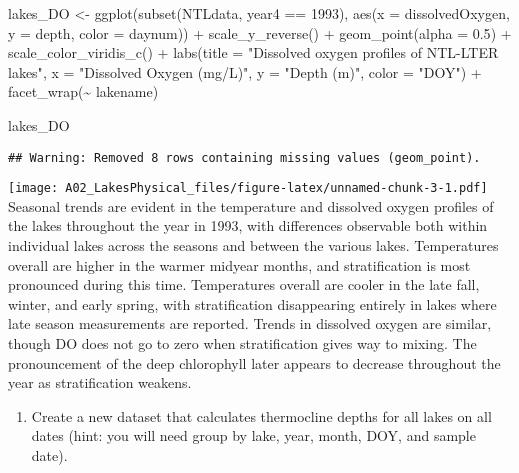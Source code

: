 \documentclass[
]{article}
\newenvironment{Shaded}{\begin{snugshade}}{\end{snugshade}}
\newcommand{\AttributeTok}[1]{\textcolor[rgb]{0.77,0.63,0.00}{#1}}
\newcommand{\DecValTok}[1]{\textcolor[rgb]{0.00,0.00,0.81}{#1}}
\newcommand{\FloatTok}[1]{\textcolor[rgb]{0.00,0.00,0.81}{#1}}
\newcommand{\FunctionTok}[1]{\textcolor[rgb]{0.00,0.00,0.00}{#1}}
\newcommand{\NormalTok}[1]{#1}
\newcommand{\OtherTok}[1]{\textcolor[rgb]{0.56,0.35,0.01}{#1}}
\newcommand{\SpecialCharTok}[1]{\textcolor[rgb]{0.00,0.00,0.00}{#1}}
\newcommand{\StringTok}[1]{\textcolor[rgb]{0.31,0.60,0.02}{#1}}
\providecommand{\tightlist}{%
  \setlength{\itemsep}{0pt}\setlength{\parskip}{0pt}}
\begin{document}
\begin{Shaded}
\begin{Highlighting}[]
\NormalTok{lakes\_DO }\OtherTok{\textless{}{-}} \FunctionTok{ggplot}\NormalTok{(}\FunctionTok{subset}\NormalTok{(NTLdata, year4 }\SpecialCharTok{==} \DecValTok{1993}\NormalTok{), }\FunctionTok{aes}\NormalTok{(}\AttributeTok{x =}\NormalTok{ dissolvedOxygen, }\AttributeTok{y =}\NormalTok{ depth, }\AttributeTok{color =}\NormalTok{ daynum)) }\SpecialCharTok{+}
            \FunctionTok{scale\_y\_reverse}\NormalTok{() }\SpecialCharTok{+}
            \FunctionTok{geom\_point}\NormalTok{(}\AttributeTok{alpha =} \FloatTok{0.5}\NormalTok{) }\SpecialCharTok{+} 
            \FunctionTok{scale\_color\_viridis\_c}\NormalTok{() }\SpecialCharTok{+} 
            \FunctionTok{labs}\NormalTok{(}\AttributeTok{title =} \StringTok{"Dissolved oxygen profiles of NTL{-}LTER lakes"}\NormalTok{,}
                 \AttributeTok{x =} \StringTok{"Dissolved Oxygen (mg/L)"}\NormalTok{, }\AttributeTok{y =} \StringTok{"Depth (m)"}\NormalTok{, }\AttributeTok{color =} \StringTok{"DOY"}\NormalTok{) }\SpecialCharTok{+}
            \FunctionTok{facet\_wrap}\NormalTok{(}\SpecialCharTok{\textasciitilde{}}\NormalTok{ lakename)}

\NormalTok{lakes\_DO}
\end{Highlighting}
\end{Shaded}

\begin{verbatim}
## Warning: Removed 8 rows containing missing values (geom_point).
\end{verbatim}

\texttt{[image: A02\_LakesPhysical\_files/figure-latex/unnamed-chunk-3-1.pdf]}
Seasonal trends are evident in the temperature and dissolved oxygen
profiles of the lakes throughout the year in 1993, with differences
observable both within individual lakes across the seasons and between
the various lakes. Temperatures overall are higher in the warmer midyear
months, and stratification is most pronounced during this time.
Temperatures overall are cooler in the late fall, winter, and early
spring, with stratification disappearing entirely in lakes where late
season measurements are reported. Trends in dissolved oxygen are
similar, though DO does not go to zero when stratification gives way to
mixing. The pronouncement of the deep chlorophyll later appears to
decrease throughout the year as stratification weakens.

\begin{enumerate}
\def\labelenumi{\arabic{enumi}.}
\setcounter{enumi}{5}
\tightlist
\item
  Create a new dataset that calculates thermocline depths for all lakes
  on all dates (hint: you will need group by lake, year, month, DOY, and
  sample date).
\end{enumerate}
\end{document}
